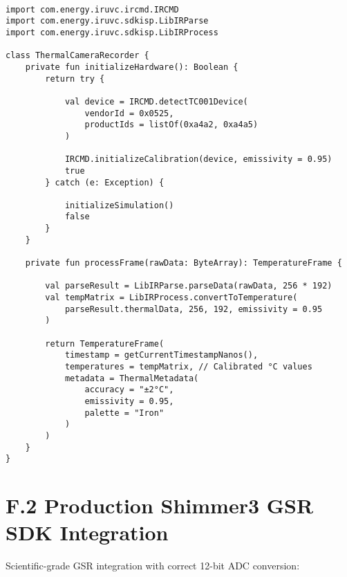 \begin{verbatim}

import com.energy.iruvc.ircmd.IRCMD
import com.energy.iruvc.sdkisp.LibIRParse
import com.energy.iruvc.sdkisp.LibIRProcess

class ThermalCameraRecorder {
    private fun initializeHardware(): Boolean {
        return try {

            val device = IRCMD.detectTC001Device(
                vendorId = 0x0525,
                productIds = listOf(0xa4a2, 0xa4a5)
            )

            IRCMD.initializeCalibration(device, emissivity = 0.95)
            true
        } catch (e: Exception) {

            initializeSimulation()
            false
        }
    }

    private fun processFrame(rawData: ByteArray): TemperatureFrame {

        val parseResult = LibIRParse.parseData(rawData, 256 * 192)
        val tempMatrix = LibIRProcess.convertToTemperature(
            parseResult.thermalData, 256, 192, emissivity = 0.95
        )

        return TemperatureFrame(
            timestamp = getCurrentTimestampNanos(),
            temperatures = tempMatrix, // Calibrated °C values
            metadata = ThermalMetadata(
                accuracy = "±2°C",
                emissivity = 0.95,
                palette = "Iron"
            )
        )
    }
}
\end{verbatim}


\section{F.2 Production Shimmer3 GSR SDK Integration}

Scientific-grade GSR integration with correct 12-bit ADC conversion:

